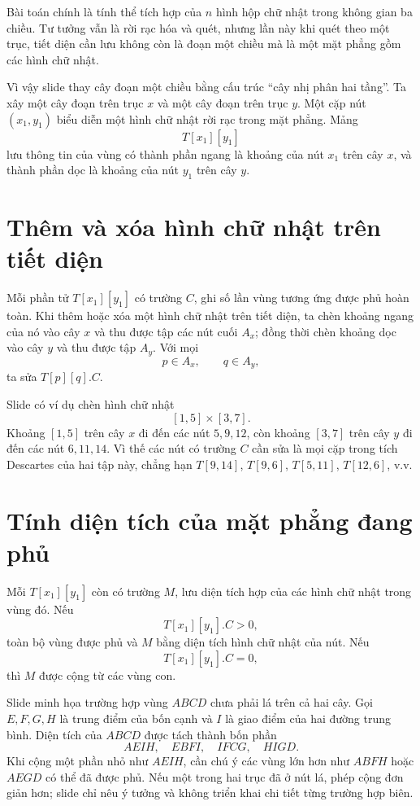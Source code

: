 \documentclass[11pt]{article}
\begin{document}
Bài toán chính là tính thể tích hợp của \(n\) hình hộp chữ nhật trong không
gian ba chiều. Tư tưởng vẫn là rời rạc hóa và quét, nhưng lần này khi quét
theo một trục, tiết diện cần lưu không còn là đoạn một chiều mà là một mặt
phẳng gồm các hình chữ nhật.

Vì vậy slide thay cây đoạn một chiều bằng cấu trúc ``cây nhị phân hai tầng''.
Ta xây một cây đoạn trên trục \(x\) và một cây đoạn trên trục \(y\). Một cặp
nút \((x_1,y_1)\) biểu diễn một hình chữ nhật rời rạc trong mặt phẳng. Mảng
\[
  T[x_1][y_1]
\]
lưu thông tin của vùng có thành phần ngang là khoảng của nút \(x_1\) trên
cây \(x\), và thành phần dọc là khoảng của nút \(y_1\) trên cây \(y\).

\section{Thêm và xóa hình chữ nhật trên tiết diện}

Mỗi phần tử \(T[x_1][y_1]\) có trường \(C\), ghi số lần vùng tương ứng được
phủ hoàn toàn. Khi thêm hoặc xóa một hình chữ nhật trên tiết diện, ta chèn
khoảng ngang của nó vào cây \(x\) và thu được tập các nút cuối \(A_x\); đồng
thời chèn khoảng dọc vào cây \(y\) và thu được tập \(A_y\). Với mọi
\[
  p\in A_x,\qquad q\in A_y,
\]
ta sửa \(T[p][q].C\).

Slide có ví dụ chèn hình chữ nhật
\[
  [1,5]\times[3,7].
\]
Khoảng \([1,5]\) trên cây \(x\) đi đến các nút \(5,9,12\), còn khoảng
\([3,7]\) trên cây \(y\) đi đến các nút \(6,11,14\). Vì thế các nút có
trường \(C\) cần sửa là mọi cặp trong tích Descartes của hai tập này, chẳng
hạn \(T[9,14]\), \(T[9,6]\), \(T[5,11]\), \(T[12,6]\), v.v.

\section{Tính diện tích của mặt phẳng đang phủ}

Mỗi \(T[x_1][y_1]\) còn có trường \(M\), lưu diện tích hợp của các hình chữ
nhật trong vùng đó. Nếu
\[
  T[x_1][y_1].C>0,
\]
toàn bộ vùng được phủ và \(M\) bằng diện tích hình chữ nhật của nút. Nếu
\[
  T[x_1][y_1].C=0,
\]
thì \(M\) được cộng từ các vùng con.

Slide minh họa trường hợp vùng \(ABCD\) chưa phải lá trên cả hai cây. Gọi
\(E,F,G,H\) là trung điểm của bốn cạnh và \(I\) là giao điểm của hai đường
trung bình. Diện tích của \(ABCD\) được tách thành bốn phần
\[
  AEIH,\quad EBFI,\quad IFCG,\quad HIGD.
\]
Khi cộng một phần nhỏ như \(AEIH\), cần chú ý các vùng lớn hơn như \(ABFH\)
hoặc \(AEGD\) có thể đã được phủ. Nếu một trong hai trục đã ở nút lá, phép
cộng đơn giản hơn; slide chỉ nêu ý tưởng và không triển khai chi tiết từng
trường hợp biên.
\end{document}
